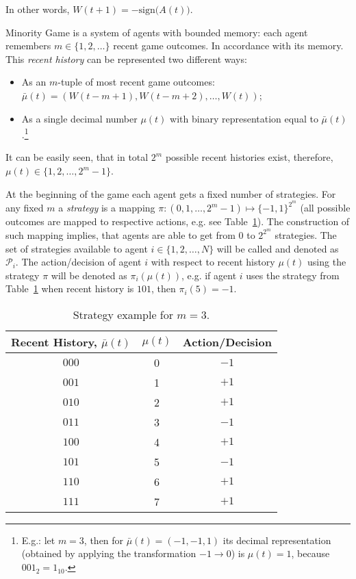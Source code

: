 \documentclass[12pt,american,czech]{article}
\begin{document}
\noindent
In other words, $W(t+1) = -\text{sign}\big(A(t)\big)$.

\medskip

Minority  Game is a system of agents with bounded memory: each agent remembers $m\in\{1,2,\dots\}$ recent game outcomes. In accordance with its memory. This \textit{recent history} can be represented two different ways:

\begin{itemize}
	\item As an $m$-tuple of most recent game outcomes: $\bar{\mu}(t)=(W(t-m+1),W(t-m+2),\dots,W(t))$;
	\item As a single decimal number $\mu(t)$ with binary representation equal to $\bar{\mu}(t)$.\footnote{E.g.: let $m=3$, then for $\bar{\mu}(t)=(-1,-1,1)$ its decimal representation (obtained by applying the transformation $-1\rightarrow 0$) is $\mu(t)=1$, because $001_{2}=1_{10}$.}
\end{itemize} 

\noindent
It can be easily seen, that in total $2^{m}$ possible recent histories exist, therefore, $\mu(t)\in\{1,2,\dots,2^{m}-1\}$.

\medskip

At the beginning of the game each agent gets a fixed number of strategies. For any fixed $m$ a \textit{strategy} is a mapping $\pi:(0,1,\dots,2^m-1)\mapsto\{-1,1\}^{2^{m}}$ (all possible outcomes are mapped to respective actions, e.g. see Table~\ref{tab:strategy_table_example}). The construction of such mapping implies, that agents are able to get from $0$ to $2^{2^{m}}$ strategies. The set of strategies available to agent $i\in\{1,2,\dots,N\}$ will be called  and denoted as $\mathcal{P}_{i}$. The action/decision of agent $i$ with respect to recent history $\mu(t)$ using the strategy $\pi$ will be denoted as $\pi_{i}(\mu(t))$, e.g. if agent $i$ uses the strategy from Table~\ref{tab:strategy_table_example} when recent history is $101$, then $\pi_{i}(5)= -1$.

\begin{table}
	\centering
	\begin{tabular}{|c|c||c|}
		\hline
		Recent History, $\bar{\mu}(t)$ & $\mu(t)$ & Action/Decision \\
		\hline
		\hline 
		$0 0 0$ & 0 & $-1$ \\ 
		$0 0 1$ & 1 & $+1$ \\ 
		$0 1 0$ & 2 & $+1$ \\ 
		$0 1 1$ & 3 & $-1$ \\ 
		$1 0 0$ & 4 & $+1$ \\ 
		$1 0 1$ & 5 & $-1$ \\ 
		$1 1 0$ & 6 & $+1$ \\ 
		$1 1 1$ & 7 & $+1$ \\
		\hline
	\end{tabular} 
	\caption{Strategy example for $m=3$.} 
	\label{tab:strategy_table_example}
\end{table}
\end{document}
